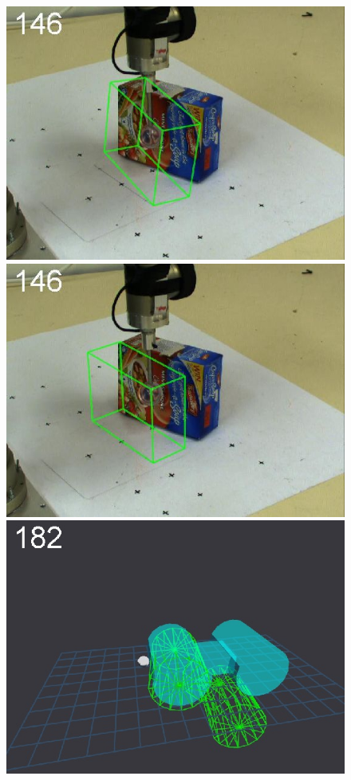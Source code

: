 \begin{figure}[t]
{\includegraphics[width=\imgCXwid]{./C1_1exp_87_3}
\includegraphics[width=\imgCXwid]{./C1_LWPR1_87_3}
\includegraphics[width=\imgCXwid]{./C5_1exp_6_3}
}
\end{figure}

